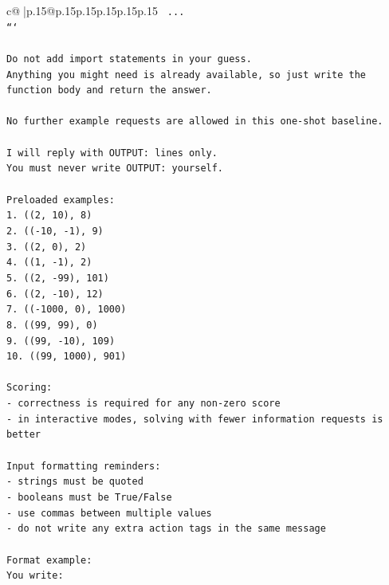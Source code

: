 \documentclass{article}
\begin{document}
{\begin{supertabular}{c@{$\;$}|p{.15\linewidth}@{}p{.15\linewidth}p{.15\linewidth}p{.15\linewidth}p{.15\linewidth}p{.15\linewidth}}
{{{\texttt{    ...} \\
\texttt{```} \\
\\ 
\texttt{Do not add import statements in your guess.} \\
\texttt{Anything you might need is already available, so just write the function body and return the answer.} \\
\\ 
\texttt{No further example requests are allowed in this one{-}shot baseline.} \\
\\ 
\texttt{I will reply with OUTPUT: lines only.} \\
\texttt{You must never write OUTPUT: yourself.} \\
\\ 
\texttt{Preloaded examples:} \\
\texttt{1. ((2, 10), 8)} \\
\texttt{2. (({-}10, {-}1), 9)} \\
\texttt{3. ((2, 0), 2)} \\
\texttt{4. ((1, {-}1), 2)} \\
\texttt{5. ((2, {-}99), 101)} \\
\texttt{6. ((2, {-}10), 12)} \\
\texttt{7. (({-}1000, 0), 1000)} \\
\texttt{8. ((99, 99), 0)} \\
\texttt{9. ((99, {-}10), 109)} \\
\texttt{10. ((99, 1000), 901)} \\
\\ 
\texttt{Scoring:} \\
\texttt{{-} correctness is required for any non{-}zero score} \\
\texttt{{-} in interactive modes, solving with fewer information requests is better} \\
\\ 
\texttt{Input formatting reminders:} \\
\texttt{{-} strings must be quoted} \\
\texttt{{-} booleans must be True/False} \\
\texttt{{-} use commas between multiple values} \\
\texttt{{-} do not write any extra action tags in the same message} \\
\\ 
\texttt{Format example:} \\
\texttt{You write:} \\
}}}
\end{supertabular}}
\end{document}
